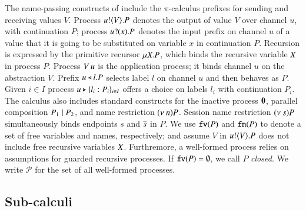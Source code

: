 The name-passing constructs of \HOp include the
$\pi$-calculus prefixes for sending and receiving values $V$.
Process $u ! \langle V \rangle . P$ denotes the output of value $V$
over channel $u$, with continuation $P$;
process $u ? (x) . P$ denotes the input prefix on channel $u$ of a value
that it is going to be substituted on variable $x$ in continuation $P$. 
Recursion is expressed by the primitive recursor $\mu X. P$,
which binds the recursive variable $X$ in process $P$.
Process $V\,u$ is the application
process; it binds channel $u$ on the abstraction $V$.
Prefix $u \triangleleft l . P$ selects label $l$ on channel $u$
and then behaves as $P$.
Given $i \in I$ process $u \triangleright \{l_i: P_i\}_{i \in I}$ offers a choice
on labels $l_i$ with continuation $P_i$.
The calculus also includes standard constructs for 
the inactive process $\mathbf{0}$, 
parallel composition $P_1 \;|\; P_2$, and 
name restriction $(\nu\ n) P$.
Session name restriction $(\nu\ s) P$ simultaneously 
binds endpoints $s$ and $\overline{s}$ in $P$.
We use $\mathtt{fv}(P)$ and $\mathtt{fn}(P)$ to denote a set of free 
variables and names, respectively; 
and assume $V$ in $u ! \langle V \rangle .{P}$ does not include free recursive 
variables $X$. 
Furthremore, a well-formed process relies on assumptions for
guarded recursive processes.
If $\mathtt{fv}(P) = \emptyset$, we call $P$ {\em closed}.
We write $\mathcal{P}$ for the set of all well-formed
processes.




\subsection{Sub-calculi}

\label{subsec:subcalculi}

